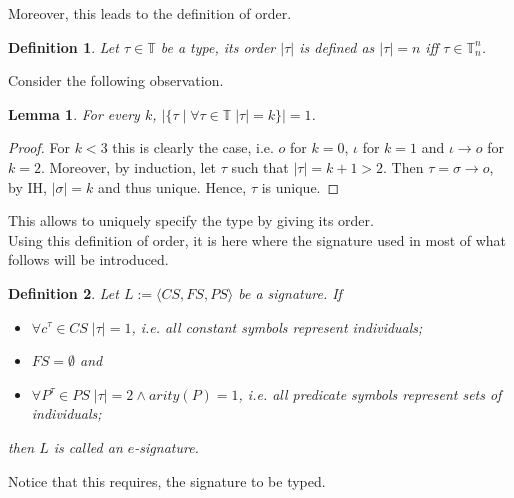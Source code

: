 \documentclass[11pt,a4paper]{article}
\newtheorem{lemma}[theorem]{Lemma}
\newtheorem{mydef}{Definition}
\newcommand{\vanB}{van Benthem}
\begin{document}
Moreover, this leads to the definition of order.

\begin{mydef}
Let $\tau \in \mathbb{T}$ be a type, its order $|\tau|$ is defined as $|\tau|=n$ iff $\tau \in \mathbb{T}_n^n$.
\end{mydef}

Consider the following observation.
\begin{lemma}
For every $k$, $|\{ \tau \mid \forall \tau \in  \mathbb{T}\; |\tau| = k\}|=1$.
\end{lemma}
\begin{proof}
For $k<3$ this is clearly the case, i.e. $o$ for $k=0$, $\iota$ for $k=1$ and $\iota \to o$ for $k=2$. Moreover, by induction, let $\tau$ such that $ |\tau|=k+1>2$. Then $\tau = \sigma \to o$, by IH, $|\sigma|=k$ and thus unique. Hence, $\tau$ is unique.
\end{proof}

This allows to uniquely specify the type by giving its order. \\

Using this definition of order, it is here where the signature used in most of what follows will be introduced. 

\begin{mydef}
Let $L:=\langle \mathit{CS}, \mathit{FS}, \mathit{PS}\rangle$ be a signature. If 
\begin{itemize}
\item $\forall c^{\tau} \in \mathit{CS} \; |\tau|=1$, i.e. all constant symbols represent individuals;
\item $ \mathit{FS}  = \emptyset$ and
\item $\forall P^{\tau} \in \mathit{PS} \; |\tau|=2 \land \mathit{arity}(P)=1$, i.e. all predicate symbols represent sets of individuals;
\end{itemize} 
then $L$ is called an $e$-signature.
\end{mydef}

Notice that this requires, the signature to be typed.
\end{document}
